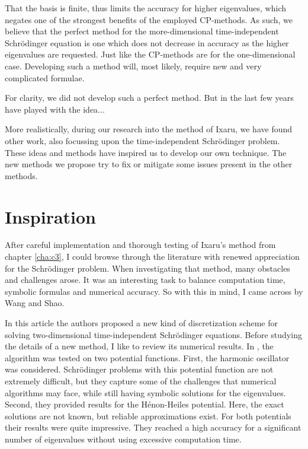 That the basis is finite, thus limits the accuracy for higher eigenvalues, which negates one of the strongest benefits of the employed CP-methods. As such, we believe that the perfect method for the more-dimensional time-independent Schrödinger equation is one which does not decrease in accuracy as the higher eigenvalues are requested. Just like the CP-methods are for the one-dimensional case. Developing such a method will, most likely, require new and very complicated formulae.

For clarity, we did not develop such a perfect method. But in the last few years  have played with the idea...

More realistically, during our research into the method of Ixaru, we have found other work, also focussing upon the time-independent Schrödinger problem. These ideas and methods have inspired us to develop our own technique. The new methods we propose try to fix or mitigate some issues present in the other methods.


\section{Inspiration}

After careful implementation and thorough testing of Ixaru's method from chapter \ref{cha:c3}, I could browse through the literature with renewed appreciation for the Schrödinger problem. When investigating that method, many obstacles and challenges arose. It was an interesting task to balance computation time, symbolic formulas and numerical accuracy. So with this in mind, I came across \cite{wang_new_2009} by Wang and Shao.

In this article the authors proposed a new kind of discretization scheme for solving two-dimensional time-independent Schrödinger equations. Before studying the details of a new method, I like to review its numerical results. In \cite{wang_new_2009}, the algorithm was tested on two potential functions. First, the harmonic oscillator was considered. Schrödinger problems with this potential function are not extremely difficult, but they capture some of the challenges that numerical algorithms may face, while still having symbolic solutions for the eigenvalues. Second, they provided results for the Hénon-Heiles potential. Here, the exact solutions are not known, but reliable approximations exist. For both potentials their results were quite impressive. They reached a high accuracy for a significant number of eigenvalues without using excessive computation time.

